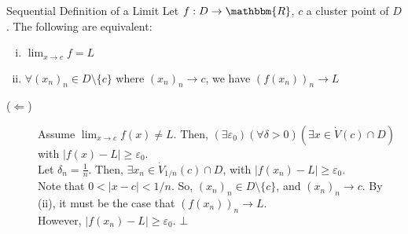 \documentclass[10pt]{extarticle}
\newcommand{\R}{\mathbbm{R}}
\begin{document}
  \begin{problem}{Sequential Definition of a Limit}
    Let $f: D\rightarrow \R$, $c$ a cluster point of $D$. The following are equivalent:
    \begin{enumerate}[(i)]
      \item $\lim_{x\rightarrow c} f = L$
      \item $\forall (x_n)_n\in D\setminus \{c\}$ where $(x_n)_n \rightarrow c$, we have $\left(f(x_n)\right)_n \rightarrow L$
    \end{enumerate}
    \tcblower
    \begin{description}
      \item[($\Leftarrow$)] Assume $\lim_{x\rightarrow c} f(x) \neq L$. Then, $\left(\exists \varepsilon_0\right)(\forall \delta > 0)(\exists x\in \dot{V}(c)\cap D)$ with $|f(x) - L| \geq \varepsilon_0$.\\

        Let $\delta_n = \frac{1}{n}$. Then, $\exists x_n\in \dot{V}_{1/n}(c)\cap D$, with $|f(x_n)- L| \geq \varepsilon_0$.\\

        Note that $0 < |x-c| < 1/n$. So, $(x_n)_n \in D\setminus \{c\}$, and $(x_n)_n \rightarrow c$. By (ii), it must be the case that $\left(f(x_n)\right)_n \rightarrow L$.\\

        However, $|f(x_n)- L| \geq \varepsilon_0$. $\bot$
    \end{description}
  \end{problem}
\end{document}
